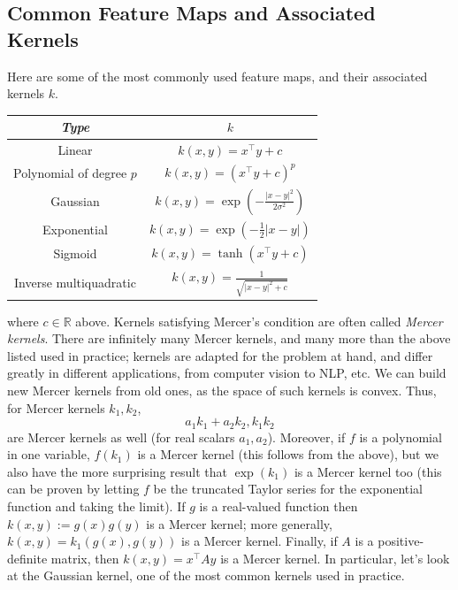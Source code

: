 \documentclass{article}
\begin{document}
\subsection{Common Feature Maps and Associated Kernels}
Here are some of the most commonly used feature maps, and their associated kernels $ k $.
\newline
\begin{center}
    \begin{tabular}{c | c}
        \textit{Type} & $ k $ \\
        \hline
        Linear & $ k(x, y) = x^\intercal y + c $ \\
        Polynomial of degree $ p $ & $ k(x, y) = (x^\intercal y + c)^p $ \\
        Gaussian & $ k(x, y) = \exp \left(- \frac{| x - y |^2}{2 \sigma^2} \right) $ \\
        Exponential & $ k(x, y) = \exp(- \frac{1}{2} | x - y |) $ \\
        Sigmoid & $ k(x, y) = \tanh(x^\intercal y + c) $ \\
        Inverse multiquadratic & $ k(x, y) = \frac{1}{\sqrt{| x - y |^2 + c}} $
    \end{tabular}
\end{center}
where $ c \in \mathbb{R} $ above. Kernels satisfying Mercer's condition are often called \textit{Mercer kernels}. There are infinitely many Mercer kernels, and many more than the above listed used in practice; kernels are adapted for the problem at hand, and differ greatly in different applications, from computer vision to NLP, etc. We can build new Mercer kernels from old ones, as the space of such kernels is convex. Thus, for Mercer kernels $ k_1, k_2 $,
$$ a_1 k_1 + a_2 k_2, k_1 k_2 $$
are Mercer kernels as well (for real scalars $ a_1, a_2 $). Moreover, if $ f $ is a polynomial in one variable, $ f(k_1) $ is a Mercer kernel (this follows from the above), but we also have the more surprising result that $ \exp(k_1) $ is a Mercer kernel too (this can be proven by letting $ f $ be the truncated Taylor series for the exponential function and taking the limit). If $ g $ is a real-valued function then $ k(x, y) := g(x) g(y) $ is a Mercer kernel; more generally, $ k(x, y) = k_1(g(x), g(y)) $ is a Mercer kernel. Finally, if $ A $ is a positive-definite matrix, then $ k(x, y) = x^\intercal A y $ is a Mercer kernel.
\newline
In particular, let's look at the Gaussian kernel, one of the most common kernels used in practice.
\newline \newline
\end{document}
